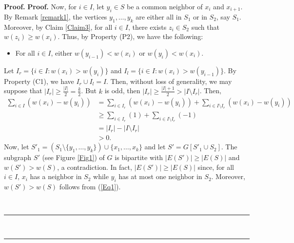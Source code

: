 \documentclass[12pt, oneside]{scrartcl}
\newenvironment{proof}[1][Proof]{\textbf{#1.} }{\ \rule{0.5em}{0.5em}}
\begin{document}
\begin{proof}
\begin{proof}
Now, for $i\in I$, let $y_i\in S$ be a common neighbor of $x_i$ and $x_{i+1}$. By Remark \ref{remark1}, the vertices $y_1,\dots ,y_k$ are either all in $S_1$ or in $S_2$, say $S_1$. Moreover, by Claim \ref{Claim3}, for all $i\in I$, there exists $z_i\in S_2$ such that $w(z_i)\geq w(x_i)$. Thus, by Property (P2), we have the following:\begin{itemize}
\item[(C1)] For all $i\in I$, either $w(y_{i-1})<w(x_i)$ or $w(y_i)<w(x_i)$.
\end{itemize}
Let $I_r=\{i\in I: w(x_i)>w(y_i)\}$ and $I_l=\{i\in I: w(x_i)>w(y_{i-1})\}$. By Property (C1), we have $I_r\cup I_l = I$. Then, without loss of generality, we may suppose that $|I_r|\geq \frac{|I|}{2}=\frac{k}{2}$. But $k$ is odd, then $|I_r|\geq \frac{|I|+1}{2}>|I\setminus I_r|$. Then,
\begin{equation}\label{Eq1}
\begin{aligned}
\sum_{i\in I} (w(x_i)-w(y_i)) &= \sum_{i\in I_r} (w(x_i)-w(y_i)) + \sum_{i\in I\setminus I_r} (w(x_i)-w(y_i))\\
&\geq \sum_{i\in I_r} (1) + \sum_{i\in I\setminus I_r} (-1)\\
&= |I_r| - |I\setminus I_r|\\
&>0.
\end{aligned}
\end{equation}
Now, let $S'_1=(S_1\setminus \{y_1,\dots ,y_k\})\cup \{x_1,\dots ,x_k\}$ and let $S'=G[S'_1\cup S_2]$. The subgraph $S'$ (see Figure \ref{Fig1}) of $G$ is bipartite with $|E(S')|\geq |E(S)|$ and $w(S')>w(S)$, a contradiction. In fact, $|E(S')|\geq |E(S)|$ since, for all $i\in I$, $x_i$ has a neighbor in $S_2$ while $y_i$ has at most one neighbor in $S_2$. Moreover, $w(S')>w(S)$ follows from (\ref{Eq1}).
\begin{figure}[h!]
\centering
{}
\end{figure}
\end{proof}
\end{proof}
\end{document}
